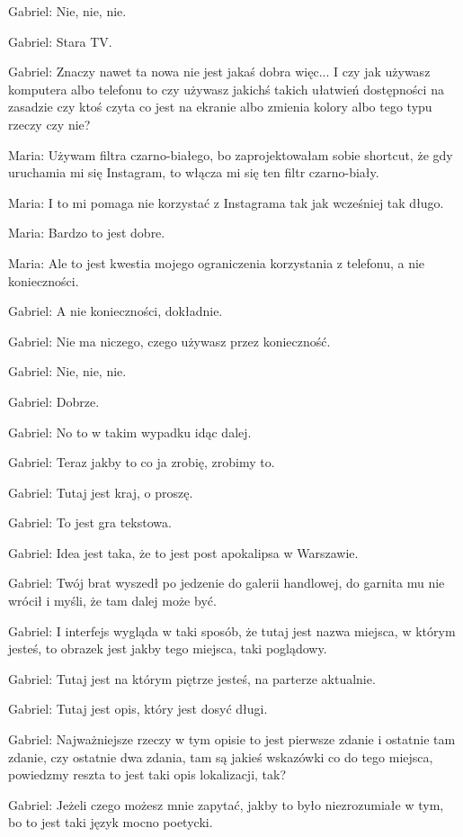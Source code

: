 Gabriel: Nie, nie, nie.

Gabriel: Stara TV.

Gabriel: Znaczy nawet ta nowa nie jest jakaś dobra więc... I czy jak używasz komputera albo telefonu to czy używasz jakichś takich ułatwień dostępności na zasadzie czy ktoś czyta co jest na ekranie albo zmienia kolory albo tego typu rzeczy czy nie?

Maria: Używam filtra czarno-białego, bo zaprojektowałam sobie shortcut, że gdy uruchamia mi się Instagram, to włącza mi się ten filtr czarno-biały.

Maria: I to mi pomaga nie korzystać z Instagrama tak jak wcześniej tak długo.

Maria: Bardzo to jest dobre.

Maria: Ale to jest kwestia mojego ograniczenia korzystania z telefonu, a nie konieczności.

Gabriel: A nie konieczności, dokładnie.

Gabriel: Nie ma niczego, czego używasz przez konieczność.

Gabriel: Nie, nie, nie.

Gabriel: Dobrze.

Gabriel: No to w takim wypadku idąc dalej.

Gabriel: Teraz jakby to co ja zrobię, zrobimy to.

Gabriel: Tutaj jest kraj, o proszę.

Gabriel: To jest gra tekstowa.

Gabriel: Idea jest taka, że to jest post apokalipsa w Warszawie.

Gabriel: Twój brat wyszedł po jedzenie do galerii handlowej, do garnita mu nie wrócił i myśli, że tam dalej może być.

Gabriel: I interfejs wygląda w taki sposób, że tutaj jest nazwa miejsca, w którym jesteś, to obrazek jest jakby tego miejsca, taki poglądowy.

Gabriel: Tutaj jest na którym piętrze jesteś, na parterze aktualnie.

Gabriel: Tutaj jest opis, który jest dosyć długi.

Gabriel: Najważniejsze rzeczy w tym opisie to jest pierwsze zdanie i ostatnie tam zdanie, czy ostatnie dwa zdania, tam są jakieś wskazówki co do tego miejsca, powiedzmy reszta to jest taki opis lokalizacji, tak?

Gabriel: Jeżeli czego możesz mnie zapytać, jakby to było niezrozumiałe w tym, bo to jest taki język mocno poetycki.

